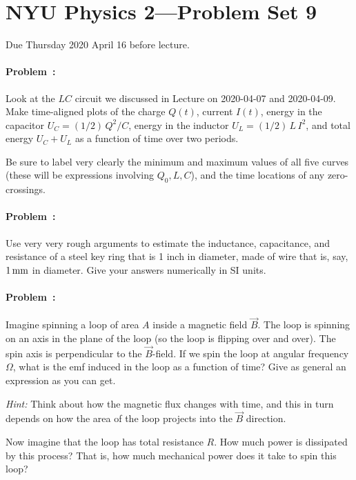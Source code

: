 \documentclass[12pt]{article}
\begin{document}
\section*{NYU Physics 2---Problem Set 9}

Due Thursday 2020 April 16 before lecture.

\paragraph{Problem~\theproblem:}%
Look at the $LC$ circuit we discussed in Lecture on 2020-04-07 and
2020-04-09. Make time-aligned plots of the charge $Q(t)$, current
$I(t)$, energy in the capacitor $U_C=(1/2)\,Q^2/C$, energy in the
inductor $U_L=(1/2)\,L\,I^2$, and total energy $U_C+U_L$ as a function
of time over two periods.

Be sure to label very clearly the minimum and maximum values of all
five curves (these will be expressions involving $Q_0, L, C$), and the
time locations of any zero-crossings.

\paragraph{Problem~\theproblem:}%
Use very very rough arguments to estimate the inductance, capacitance,
and resistance of a steel key ring that is 1 inch in diameter, made of
wire that is, say, $1\,\mathrm{mm}$ in diameter. Give your answers numerically
in SI units.

\paragraph{Problem~\theproblem:}%
Imagine spinning a loop of area $A$ inside a magnetic field $\vec{B}$.
The loop is spinning on an axis in the plane of the loop (so the loop
is flipping over and over).  The spin axis is perpendicular to the
$\vec{B}$-field.  If we spin the loop at angular frequency $\Omega$,
what is the emf induced in the loop as a function of time? Give as
general an expression as you can get.

\textsl{Hint:} Think about how the magnetic flux changes with time,
and this in turn depends on how the area of the loop projects into the
$\vec{B}$ direction.

Now imagine that the loop has total resistance $R$. How much power is
dissipated by this process? That is, how much mechanical power does it
take to spin this loop?
\end{document}
